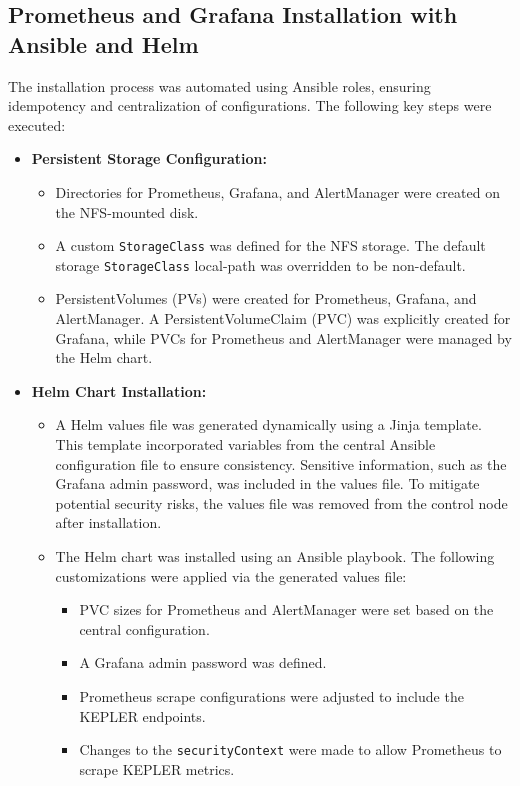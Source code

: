 \subsection{Prometheus and Grafana Installation with Ansible and Helm}

The installation process was automated using Ansible roles, ensuring idempotency and centralization of configurations. The following key steps were executed:

\begin{itemize}  
    \item \textbf{Persistent Storage Configuration:}
    \begin{itemize}
        \item Directories for Prometheus, Grafana, and AlertManager were created on the NFS-mounted disk.
        \item A custom \texttt{StorageClass} was defined for the NFS storage. The default storage \texttt{StorageClass} local-path was overridden to be non-default.
        \item PersistentVolumes (PVs) were created for Prometheus, Grafana, and AlertManager. A PersistentVolumeClaim (PVC) was explicitly created for Grafana, while PVCs for Prometheus and AlertManager were managed by the Helm chart.
    \end{itemize}

    \item \textbf{Helm Chart Installation:}
    \begin{itemize}
        \item A Helm values file was generated dynamically using a Jinja template. This template incorporated variables from the central Ansible configuration file to ensure consistency. Sensitive information, such as the Grafana admin password, was included in the values file. To mitigate potential security risks, the values file was removed from the control node after installation.
        \item The Helm chart was installed using an Ansible playbook. The following customizations were applied via the generated values file:
        \begin{itemize}
            \item PVC sizes for Prometheus and AlertManager were set based on the central configuration.
            \item A Grafana admin password was defined.
            \item Prometheus scrape configurations were adjusted to include the KEPLER endpoints.
            \item Changes to the \texttt{securityContext} were made to allow Prometheus to scrape KEPLER metrics.
        \end{itemize}
    \end{itemize}


\end{itemize}
